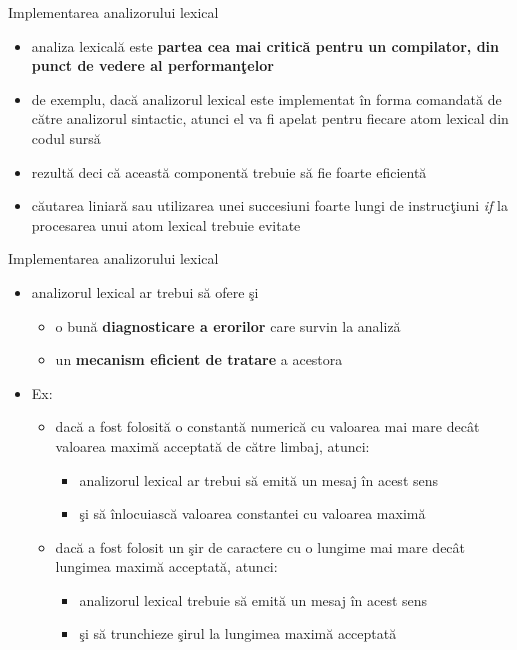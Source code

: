 \documentclass[pdf]{beamer}
\begin{document}
\begin{frame}{Implementarea analizorului lexical}
\begin{itemize}
\item 
analiza lexicală este \textbf{partea cea mai critică pentru un compilator, din punct de vedere al performanţelor}

\item
de exemplu, dacă analizorul lexical este implementat în forma comandată de către analizorul sintactic, atunci el va fi apelat pentru fiecare atom lexical din codul sursă

\item
rezultă deci că această componentă trebuie să fie foarte eficientă

\item 
căutarea liniară sau utilizarea unei succesiuni foarte lungi de instrucţiuni \textit{if} la procesarea unui atom lexical trebuie evitate
\end{itemize}
\end{frame}



\begin{frame}{Implementarea analizorului lexical}
\begin{itemize}
\item
analizorul lexical ar trebui să ofere şi
\begin{itemize}
\item
o bună \textbf{diagnosticare a erorilor} care survin la analiză
\item
un \textbf{mecanism eficient de tratare} a acestora
\end{itemize}

\item
Ex:
\begin{itemize}
\item
dacă a fost folosită o constantă numerică cu valoarea mai mare decât valoarea maximă acceptată de către limbaj, atunci:
\begin{itemize}
\item
analizorul lexical ar trebui să emită un mesaj în acest sens
\item
şi să înlocuiască valoarea constantei cu valoarea maximă
\end{itemize}

\item
dacă a fost folosit un şir de caractere cu o lungime mai mare decât lungimea maximă acceptată, atunci:
\begin{itemize}
\item
analizorul lexical trebuie să emită un mesaj în acest sens
\item
şi să trunchieze şirul la lungimea maximă acceptată
\end{itemize}
\end{itemize}
\end{itemize}
\end{frame}
\end{document}
